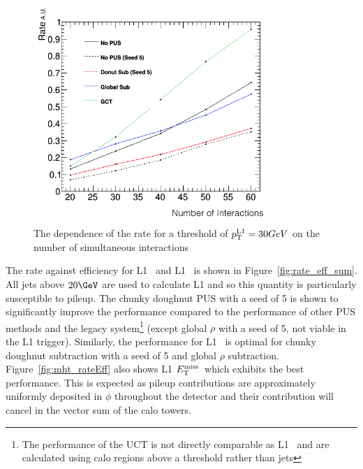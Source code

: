 \begin{figure}
\centering
    \includegraphics[width=0.8\textwidth]{./Figures/triggerUpgrade/neutrinonvtx_jet1}
  \caption{The dependence of the rate for a threshold of ${p_{\text T}^{\text{L1}}}=30GeV$ on the number of simultaneous interactions}
  \label{fig:rate_nvtx}
\end{figure}

The rate against efficiency for L1 \scalht~and L1 \mht~is shown in Figure~\ref{fig:rate_eff_sum}. All jets above $20\GeV$ are
used to calculate L1 \scalht and so this quantity is particularly susceptible to pileup. The chunky doughnut 
PUS with a seed of 5 is shown to significantly improve the performance compared to the performance of other PUS
methods and the legacy system\footnote{The performance of the UCT is not 
directly comparable as L1 \scalht~and \mht are calculated using calo regions above a threshold
rather than jets} (except global $\rho$ with a seed of 5, not viable in the L1 trigger). Similarly, the performance for 
L1 \mht~is optimal for chunky doughnut subtraction with a seed of 5 and global $\rho$ subtraction. 
Figure~\ref{fig:mht_rateEff} also shows L1 $\mbox{$E_\text{T}^{\rm miss}$}$~which exhibits the best performance. This is expected as 
pileup contributions are approximately uniformly deposited in $\phi$ throughout the detector and their contribution will
cancel in the vector sum of the calo towers.

